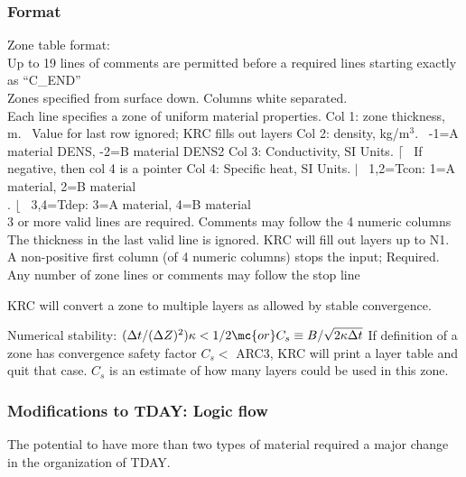 \documentclass{article}
\begin{document}
\subsubsection{Format \label{zform}}
Zone table format: 
\\ Up to 19 lines of comments are permitted before a required lines starting exactly as ``C_END''
\\ Zones specified from surface down. Columns white separated.
\\ Each line specifies a zone of uniform material properties.
\qi Col 1: zone thickness, m. \  Value for last row ignored; KRC fills out layers
\qi Col 2: density, kg/m$^3$.   \  -1=A material DENS,   -2=B material DENS2
\qi Col 3: Conductivity, SI Units. $\lceil$ \ If negative, then col 4 is a pointer
\qi Col 4: Specific heat, SI Units. $|$ \ 1,2=Tcon: 1=A material, 2=B material
 \\. \hspace{4.cm} $\lfloor$ \ 3,4=Tdep: 3=A material, 4=B material
\\ 3 or more valid lines are required. Comments may follow the 4 numeric columns
\\ The thickness in the last valid line is ignored. KRC will fill out layers up to N1. 
\\ A non-positive first column (of 4 numeric columns) stops the input; Required.
\qi Any number of zone lines or comments may follow the stop line

KRC will convert a zone to multiple layers as allowed by stable convergence.

Numerical stability: $ (\Delta t / (\Delta Z)^2) \kappa < 1/2  \mc{or} C_s \equiv B / \sqrt{2  \kappa \Delta t}$
\qii If definition of a zone has convergence safety factor $C_s <$ ARC3, KRC will print a layer table and quit that case.
\qii $C_s$ is an estimate of how many layers could be used in this zone.

\subsubsection{Modifications to TDAY: Logic flow }
The potential to have more than two types of material required a major change in the organization of TDAY. 
\end{document}
